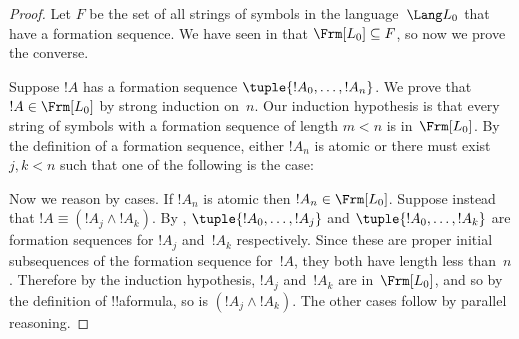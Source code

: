 \documentclass[../../../include/open-logic-section]{subfiles}
\begin{document}
\begin{proof}
Let $F$ be the set of all strings of symbols in the language~$\Lang
L_0$ that have a formation sequence. We have seen in
 that $\Frm[L_0] \subseteq F$, so
now we prove the converse.

Suppose $!A$ has a formation sequence $\tuple{!A_0,\dotsc,!A_n}$.
We prove that $!A \in \Frm[L_0]$ by strong induction on~$n$.
Our induction hypothesis is that every string of symbols with a
formation sequence of length $m < n$ is in~$\Frm[L_0]$.
By the definition of a formation sequence, either $!A_n$ is
atomic or there must exist $j,k < n$ such that one of the
following is the case:
\begin{enumerate}
\end{enumerate}
Now we reason by cases. If $!A_n$ is atomic then
$!A_n \in \Frm[L_0]$. Suppose instead that $!A \equiv
(!A_j \land !A_k)$. By ,
$\tuple{!A_0,\dotsc,!A_j}$ and $\tuple{!A_0,\dotsc,!A_k}$ are
formation sequences for $!A_j$ and~$!A_k$ respectively. Since
these are proper initial subsequences of the formation sequence
for~$!A$, they both have length less than~$n$. Therefore by
the induction hypothesis, $!A_j$ and~$!A_k$ are in~$\Frm[L_0]$,
and so by the definition of !!a{formula}, so is
$(!A_j \land !A_k)$. The other cases follow by parallel
reasoning.
\end{proof}
\end{document}
